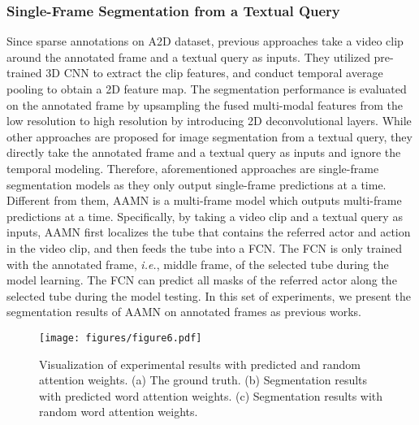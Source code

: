 \documentclass[journal]{IEEEtran}
\begin{document}
\subsubsection{Single-Frame Segmentation from a Textual Query}

Since sparse annotations on A2D dataset, previous approaches \cite{gavrilyuk2018actor,wang2019asymmetric,wang2020context,mcintosh2018multi} take a video clip around the annotated frame and a textual query as inputs. They utilized pre-trained 3D CNN to extract the clip features, and conduct temporal average pooling to obtain a 2D feature map. The segmentation performance is evaluated on the annotated frame by upsampling the fused multi-modal features from the low resolution to high resolution by introducing 2D deconvolutional layers. While other approaches \cite{hu2016segmentation,li2017tracking} are proposed for image segmentation from a textual query, they directly take the annotated frame and a textual query as inputs and ignore the temporal modeling. Therefore, aforementioned approaches are single-frame segmentation models as they only output single-frame predictions at a time. Different from them, AAMN is a multi-frame model which outputs multi-frame predictions at a time. Specifically, by taking a video clip and a textual query as inputs, AAMN first localizes the tube that contains the referred actor and action in the video clip, and then feeds the tube into a FCN. The FCN is only trained with the annotated frame, \emph{i.e.}, middle frame, of the selected tube during the model learning. The FCN can predict all masks of the referred actor along the selected tube during the model testing. In this set of experiments, we present the segmentation results of AAMN on annotated frames as previous works.

\begin{figure}[!tb]
\centering
\texttt{[image: figures/figure6.pdf]}
\caption{Visualization of experimental results with predicted and random attention weights. (a) The ground truth. (b) Segmentation results with predicted word attention weights. (c) Segmentation results with random word attention weights.}
\label{fig:random_visualization}
\vspace{-0.4cm}
\end{figure}
\end{document}
